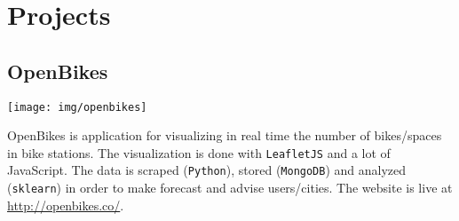 \section{Projects}

\subsection{OpenBikes}
\noindent
\begin{minipage}{.15\textwidth}
\centerline{\texttt{[image: img/openbikes]}}
\end{minipage}%
\hspace{5mm}
\begin{minipage}{.8\textwidth}
\raggedright
OpenBikes is application for visualizing in real time the number of bikes/spaces in bike stations. The visualization is done with \texttt{LeafletJS} and a lot of JavaScript. The data is scraped (\texttt{Python}), stored (\texttt{MongoDB}) and analyzed (\texttt{sklearn}) in order to make forecast and advise users/cities. The website is live at \textcolor{cyan}{\url{http://openbikes.co/}}.
\end{minipage}
